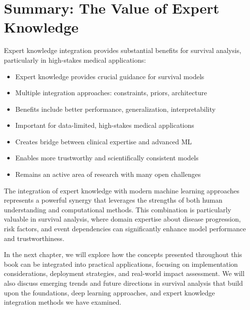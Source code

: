 \section{Summary: The Value of Expert Knowledge}

Expert knowledge integration provides substantial benefits for survival analysis, particularly in high-stakes medical applications:

\begin{itemize}
    \item Expert knowledge provides crucial guidance for survival models
    \item Multiple integration approaches: constraints, priors, architecture
    \item Benefits include better performance, generalization, interpretability
    \item Important for data-limited, high-stakes medical applications
    \item Creates bridge between clinical expertise and advanced ML
    \item Enables more trustworthy and scientifically consistent models
    \item Remains an active area of research with many open challenges
\end{itemize}

The integration of expert knowledge with modern machine learning approaches represents a powerful synergy that leverages the strengths of both human understanding and computational methods. This combination is particularly valuable in survival analysis, where domain expertise about disease progression, risk factors, and event dependencies can significantly enhance model performance and trustworthiness.

\begin{notebox}[title=Looking Ahead]
In the next chapter, we will explore how the concepts presented throughout this book can be integrated into practical applications, focusing on implementation considerations, deployment strategies, and real-world impact assessment. We will also discuss emerging trends and future directions in survival analysis that build upon the foundations, deep learning approaches, and expert knowledge integration methods we have examined.
\end{notebox}